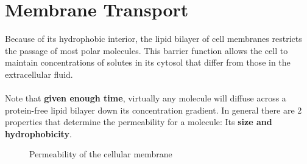 \documentclass[../main.tex]{subfiles}
\begin{document}
\section{Membrane Transport}
Because of its hydrophobic interior, the lipid bilayer of cell membranes restricts the passage of most polar molecules. This barrier function allows the cell to maintain concentrations of solutes in its cytosol that differ from those in the extracellular fluid. \\
\\
Note that \textbf{given enough time}, virtually any molecule will diffuse across a protein-free lipid bilayer down its concentration gradient. In general there are 2 properties that determine the permeability for a molecule: Its \textbf{size and hydrophobicity}.  
\begin{figure}[H]
	\centering
	\caption{Permeability of the cellular membrane}
\end{figure}
\end{document}
